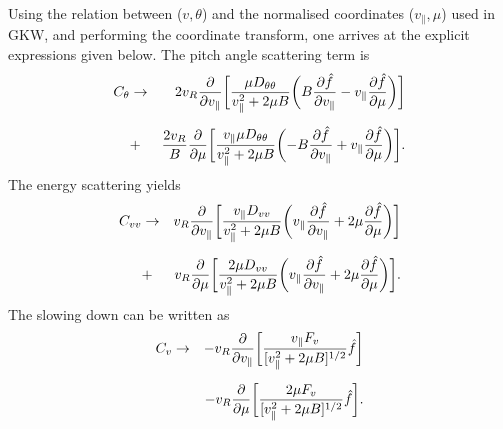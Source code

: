 Using the relation between ($v,\theta$) and the normalised coordinates ($v_{\parallel},\mu$) used in GKW, and performing 
the coordinate transform, one arrives at the explicit expressions given below. The pitch angle scattering term is 
\begin{align}
C_{\theta}  &\rightarrow & 
{2 v_R} {\partial \over \partial v_{\parallel}} \biggl [ {\mu D_{\theta \theta} \over 
v_{\parallel}^2 + 2 \mu B} \biggl ( B {\partial \hat{f}\over \partial v_{\parallel}} - v_{\parallel} 
{\partial \hat{f}\over \partial \mu} \biggr ) \biggr ] \cr 
\noalign{\vskip 0.2 truecm} 
&+& {2 v_R \over  B} {\partial \over \partial \mu} 
\biggl [ {v_{\parallel} \mu D_{\theta \theta} \over v_{\parallel}^2 + 2 \mu B} \biggl ( - B 
{\partial \hat{f} \over \partial v_{\parallel}} + v_{\parallel} {\partial \hat{f}\over \partial \mu} \biggr ) \biggr ] .
\end{align}
The energy scattering yields 
\begin{align}
C_{vv} & \rightarrow & 
v_R {\partial \over \partial v_{\parallel} } 
\biggl [  {v_{\parallel} D_{vv} \over v_{\parallel}^2 + 2 \mu B} \biggl ( v_{\parallel} {\partial 
\hat{f} \over \partial v_{\parallel}} + 2 \mu {\partial \hat{f} \over \partial \mu} \biggr ) \biggr ] \cr 
\noalign{\vskip 0.2 truecm}
&+& v_R {\partial \over \partial \mu} \biggl [ {2 \mu D_{vv} \over v_{\parallel }^2 + 
2 \mu B} \biggl ( v_{\parallel} {\partial \hat{f} \over \partial v_{\parallel}} + 2 \mu {\partial \hat{f} \over 
\partial \mu}\biggr ) \biggr ] .
\end{align}
The slowing down can be written as 
\begin{align}
C_{v}  &\rightarrow & -
v_R {\partial \over \partial v_{\parallel} } \biggl [  {v_{\parallel} F_v \over [ v_{\parallel}^2 
+ 2 \mu B ]^{1/2}} \hat{f}  \biggr ] \cr
\noalign{\vskip 0.2 truecm}
& & - v_R {\partial \over \partial \mu} \biggl [ {2 \mu F_v \over [v_{\parallel }^2 + 
2 \mu B]^{1/2}} \hat{f} \biggr ] . 
\end{align}

